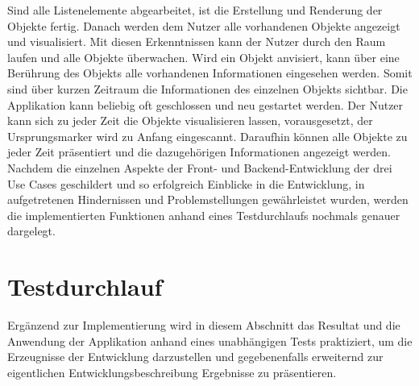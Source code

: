 Sind alle Listenelemente abgearbeitet, ist die Erstellung und Renderung der Objekte fertig. Danach werden dem Nutzer alle vorhandenen Objekte angezeigt und 
visualisiert. Mit diesen Erkenntnissen kann der Nutzer durch den Raum laufen und alle Objekte überwachen. Wird ein Objekt anvisiert, kann über eine Berührung 
des Objekts alle vorhandenen Informationen eingesehen werden. Somit sind über kurzen Zeitraum die Informationen des einzelnen Objekts sichtbar.  
Die Applikation kann beliebig oft geschlossen und neu gestartet werden. Der Nutzer kann sich zu jeder Zeit die Objekte visualisieren lassen, vorausgesetzt, der 
Ursprungsmarker wird zu Anfang eingescannt. Daraufhin können alle Objekte zu jeder Zeit präsentiert und die dazugehörigen Informationen angezeigt werden.
\\ 
\linebreak
Nachdem die einzelnen Aspekte der Front- und Backend-Entwicklung der drei Use Cases geschildert und so erfolgreich Einblicke in die Entwicklung, in 
aufgetretenen Hindernissen und Problemstellungen gewährleistet wurden, werden die implementierten Funktionen anhand eines Testdurchlaufs nochmals genauer 
dargelegt.
\section{Testdurchlauf} %
\label{chap:testdurchlauf}
Ergänzend zur Implementierung wird in diesem Abschnitt das Resultat und die Anwendung der Applikation anhand eines unabhängigen Tests praktiziert, um die 
Erzeugnisse der Entwicklung darzustellen und gegebenenfalls erweiternd zur eigentlichen Entwicklungsbeschreibung Ergebnisse zu präsentieren.